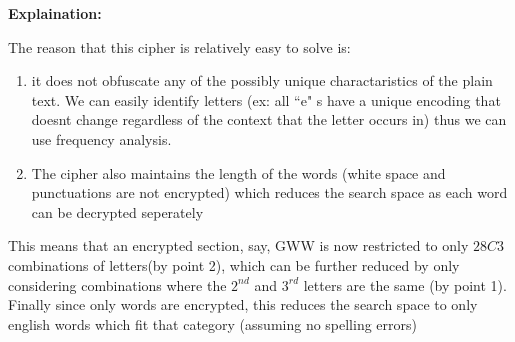 \documentclass{article}
\numberwithin{equation}{subsection}
\begin{document}
	\textbf{Explaination:}
	\par{
		The reason that this cipher is relatively easy to solve is:
		
		\begin{enumerate}
			\item it does not
		obfuscate any of the possibly unique charactaristics of the plain text. We can easily identify
		letters (ex: all ``e" s have a unique encoding that doesnt change regardless
		of the context that the letter occurs in) thus we can use frequency analysis. 
		\item The cipher also 
		maintains the length of the words (white space and punctuations are not encrypted) which reduces
		the search space as each word can be decrypted seperately 		
	\end{enumerate}

	This means that an encrypted section, say, GWW is now restricted to only $28C3$ combinations
	of letters(by point 2), which can be further reduced by only considering 
	combinations where the $2^{nd}$ and $3^{rd}$ letters are the same (by point 1). Finally 
	since only words are encrypted, this reduces the search space to only english words which fit that
	category (assuming no spelling errors)

				
	}
\end{document}
